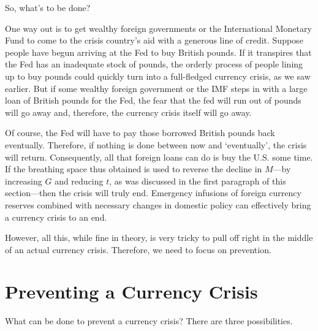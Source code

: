 \documentclass[
  letterpaper,
]{book}
\theoremstyle{plain}
\theoremstyle{remark}
\begin{document}
So, what's to be done?

One way out is to get wealthy foreign governments or the International
Monetary Fund to come to the crisis
country's aid with a generous line of credit. Suppose people have begun
arriving at the Fed to buy British pounds. If it transpires that the Fed
has an inadequate stock of pounds, the orderly process of people lining
up to buy pounds could quickly turn into a full-fledged currency crisis,
as we saw earlier. But if some wealthy foreign government or the IMF
steps in with a large loan of British pounds for the Fed, the fear that
the fed will run out of pounds will go away and, therefore, the currency
crisis itself will go away.

Of course, the Fed will have to pay those borrowed British pounds back
eventually. Therefore, if nothing is done between now and `eventually',
the crisis will return. Consequently, all that foreign loans can do is
buy the U.S. some time. If the breathing space thus obtained is used to
reverse the decline in \(M\)---by increasing \(G\) and reducing \(t\),
as was discussed in the first paragraph of this section---then the
crisis will truly end. Emergency infusions of foreign currency reserves
combined with necessary changes in domestic policy can effectively bring
a currency crisis to an end.

However, all this, while fine in theory, is very tricky to pull off
right in the middle of an actual currency crisis. Therefore, we need to
focus on prevention.

\section{Preventing a Currency Crisis}\label{sec-preven}

What can be done to prevent a currency crisis? There are three
possibilities.
\end{document}

